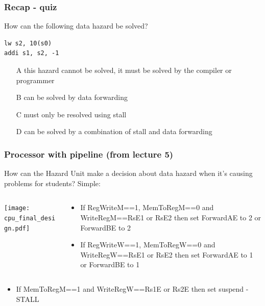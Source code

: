 \documentclass{beamer}
\begin{document}
\begin{frame}[fragile]
\frametitle{Recap - quiz}

How can the following data hazard be solved?

\begin{verbatim}
lw s2, 10(s0)
addi s1, s2, -1
\end{verbatim}
\bigskip
\begin{itemize}
 \item[A] this hazard cannot be solved, it must be solved by the compiler or programmer
 \item[B] can be solved by data forwarding
 \item[C] must only be resolved using stall
 \item[D] can be solved by a combination of stall and data forwarding
\end{itemize}

\end{frame}


\begin{frame}

\frametitle{Processor with pipeline (from lecture 5)}

How can the Hazard Unit make a decision about data hazard when it's causing problems for students? Simple:
\begin{columns}
\begin{column}{0.67\textwidth}
\texttt{[image: cpu\_final\_design.pdf]}
\end{column}
\begin{column}{0.33\textwidth}
\footnotesize
\begin{itemize}
\item If RegWriteM==1, MemToRegM==0 and WriteRegM==RsE1 or RsE2 then set ForwardAE to 2 or ForwardBE to 2
\item If RegWriteW==1, MemToRegW==0 and WriteRegW==RsE1 or RsE2 then set ForwardAE to 1 or ForwardBE to 1
\end{itemize}
\end{column}
\end{columns}
\bigskip
\footnotesize
\begin{itemize}
\item If MemToRegM==1 and WriteRegW==Rs1E or Rs2E then set suspend - STALL
\end{itemize}
\end{frame}
\end{document}
